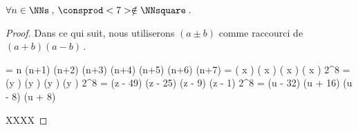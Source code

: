 \begin{fact} \label{case-8}
	 $\forall n \in \NNs$\,, $\consprod<7> \notin \NNsquare$\,.
\end{fact}




\begin{proof}
    Dans ce qui suit, nous utiliserons $(a \pm b)$ comme raccourci de $(a + b) (a - b)$\,.

    \begin{stepcalc}[style = ar*, ope = \iff]
    	 = 
			n (n+1) (n+2) (n+3) (n+4) (n+5) (n+6) (n+7)
    	\consprod<7> = 
			\big( x \pm {} \big) \big( x \pm {} \big) \big( x \pm {} \big) \big( x \pm {} \big) 
    	2^8 \consprod<7> = 
			(y ) (y ) (y ) (y )
    	2^8 \consprod<7> = 
			(z - 49) (z - 25) (z - 9) (z - 1) 
    	2^8 \consprod<7> = 
			(u - 32) (u + 16) (u - 8) (u + 8)
    \end{stepcalc}

    XXXX
\end{proof}

